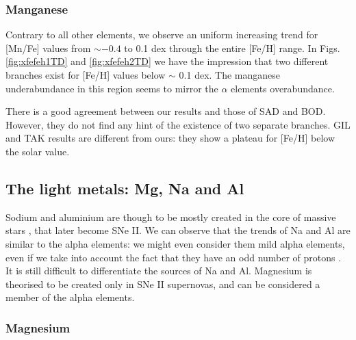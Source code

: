 \documentclass[oldversion]{aa}
\begin{document}
\subsubsection{Manganese}

Contrary to all other elements, we observe an uniform increasing trend for [Mn/Fe] values from $\sim -0.4$ to 0.1 dex through the entire [Fe/H] range. In Figs. \ref{fig:xfefeh1TD} and \ref{fig:xfefeh2TD} we have the impression that two different branches exist for [Fe/H] values below $\sim$ 0.1 dex. The manganese underabundance in this region seems to mirror the $\alpha$ elements overabundance. %

There is a good agreement between our results and those of SAD and BOD. However, they do not find any hint of the existence of two separate branches. %
GIL and TAK results are different from ours: they show a plateau for [Fe/H] below the solar value. 


\subsection{The light metals: Mg, Na and Al}

Sodium and aluminium are though to be mostly created in the core of massive stars \citep{Chen-2000}, that later become SNe II. We can observe that the trends of Na and Al are similar to the alpha elements: we might even consider them mild alpha elements, even if we take into account the fact that they have an odd number of protons \citep{McWilliam-1997}. %
It is still difficult to differentiate the sources of Na and Al. Magnesium is theorised to be created only in SNe II supernovas, and can be considered a member of the alpha elements. 

\subsubsection {Magnesium}
\end{document}
